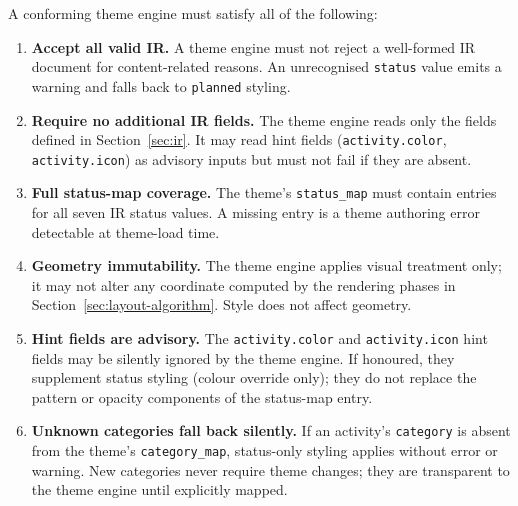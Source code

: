 A conforming theme engine must satisfy all of the following:

\begin{enumerate}
  \item \textbf{Accept all valid IR.} A theme engine must not reject a well-formed IR
        document for content-related reasons. An unrecognised \texttt{status} value emits
        a warning and falls back to \texttt{planned} styling.
  \item \textbf{Require no additional IR fields.} The theme engine reads only the fields
        defined in Section~\ref{sec:ir}. It may read hint fields (\texttt{activity.color},
        \texttt{activity.icon}) as advisory inputs but must not fail if they are absent.
  \item \textbf{Full status-map coverage.} The theme's \texttt{status\_map} must contain
        entries for all seven IR status values. A missing entry is a theme authoring error
        detectable at theme-load time.
  \item \textbf{Geometry immutability.} The theme engine applies visual treatment only; it
        may not alter any coordinate computed by the rendering phases in
        Section~\ref{sec:layout-algorithm}. Style does not affect geometry.
  \item \textbf{Hint fields are advisory.} The \texttt{activity.color} and
        \texttt{activity.icon} hint fields may be silently ignored by the theme engine. If
        honoured, they supplement status styling (colour override only); they do not replace
        the pattern or opacity components of the status-map entry.
  \item \textbf{Unknown categories fall back silently.} If an activity's \texttt{category}
        is absent from the theme's \texttt{category\_map}, status-only styling applies
        without error or warning. New categories never require theme changes; they are
        transparent to the theme engine until explicitly mapped.
\end{enumerate}
